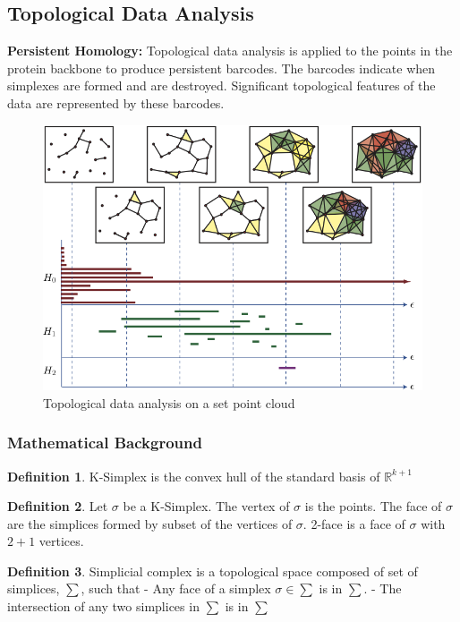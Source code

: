 \documentclass[12pt, a4paper, twocolumn, fullpage]{article}
\theoremstyle{plain}
\theoremstyle{definition}
\newtheorem{defn}{Definition}[section]
\theoremstyle{remark}
\begin{document}
\subsection{ Topological Data Analysis}
\textbf{Persistent Homology: } Topological data analysis is applied to the points in the protein backbone to produce persistent barcodes. The barcodes indicate when simplexes are formed and are destroyed. Significant topological features of the data are represented by these barcodes.


\begin{figure}[h]
	\includegraphics[width=\linewidth]{tdaexample.png}
	\caption{Topological data analysis on a set point cloud}
	\label{fig:tdaex}
\end{figure}


\subsubsection{ Mathematical Background}
\begin{defn}
K-Simplex is the convex hull of the standard basis of $ \mathbb{R}^{k+1} $
\end{defn}

\begin{defn}
Let $\sigma$ be a K-Simplex.
The vertex of $\sigma$ is the points.
The face of $\sigma$ are the simplices formed by subset of the vertices of $\sigma$.
2-face is a face of $\sigma$ with $2+1$ vertices.
\end{defn}

\begin{defn}
Simplicial complex is a topological space composed of set of simplices, $ \sum $, such that 
- Any face of a simplex $\sigma \in \sum$ is in $\sum$.
- The intersection of any two simplices in $ \sum $ is in $ \sum $
\end{defn}
\end{document}
